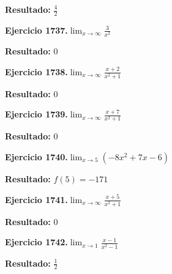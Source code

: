 \documentclass[10pt,a4paper]{article}
\begin{document}
\begin{solbox}
\textbf{Resultado:} \(\displaystyle \frac{4}{2}\)
\end{solbox}

\begin{ejbox}
\textbf{Ejercicio 1737.}\quad $\lim_{x\to \infty} \frac{3}{x^2}$
\end{ejbox}

\begin{solbox}
\textbf{Resultado:} \(\displaystyle 0\)
\end{solbox}

\newpage
\begin{ejbox}
\textbf{Ejercicio 1738.}\quad $\lim_{x\to \infty} \frac{x + 2}{x^2 + 1}$
\end{ejbox}

\begin{solbox}
\textbf{Resultado:} \(\displaystyle 0\)
\end{solbox}

\begin{ejbox}
\textbf{Ejercicio 1739.}\quad $\lim_{x\to \infty} \frac{x + 7}{x^2 + 1}$
\end{ejbox}

\begin{solbox}
\textbf{Resultado:} \(\displaystyle 0\)
\end{solbox}

\begin{ejbox}
\textbf{Ejercicio 1740.}\quad $\lim_{x\to 5} (-8x^2 +7x -6)$
\end{ejbox}

\begin{solbox}
\textbf{Resultado:} \(\displaystyle f(5) = -171\)
\end{solbox}

\newpage
\begin{ejbox}
\textbf{Ejercicio 1741.}\quad $\lim_{x\to \infty} \frac{x + 5}{x^2 + 1}$
\end{ejbox}

\begin{solbox}
\textbf{Resultado:} \(\displaystyle 0\)
\end{solbox}

\begin{ejbox}
\textbf{Ejercicio 1742.}\quad $\lim_{x\to 1} \frac{x-1}{x^2-1}$
\end{ejbox}

\begin{solbox}
\textbf{Resultado:} \(\displaystyle \frac{1}{2}\)
\end{solbox}
\end{document}
